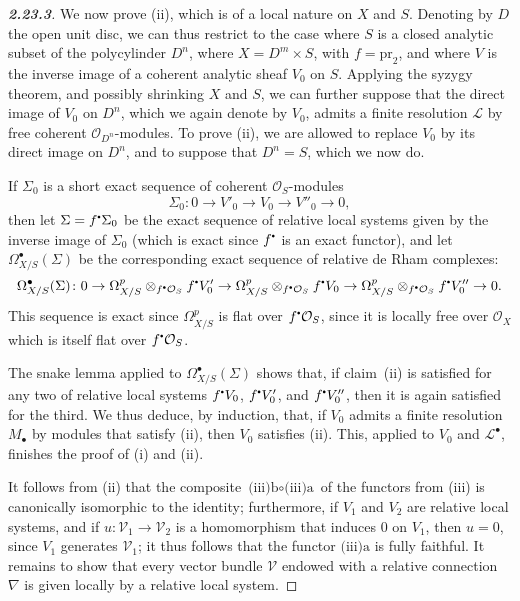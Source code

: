 \documentclass{report}
\newcommand{\scr}[1]{{\mathscr{#1}}}
\renewcommand{\cal}[1]{{\mathcal{#1}}}
\newcommand{\sbullet}{{\mathbin{\vcenter{\hbox{\scalebox{.5}{$\bullet$}}}}}}
\newcommand{\pr}{\mathrm{pr}}
\newcommand{\oldpage}[1]{\marginpar{\footnotesize$\Big\vert$ \textit{p.~#1}}}
\begin{document}
\begin{proof}[\normalfont\textbf{2.23.3}]
\label{I.2.23.3}
  We now prove (ii), which is of a local nature on $X$ and $S$.
  Denoting by $D$ the open unit disc, we can thus restrict to the case where $S$ is a closed analytic subset of the polycylinder $D^n$, where $X=D^m\times S$, with $f=\pr_2$, and where $V$ is the inverse image of a coherent analytic sheaf $V_0$ on $S$.
  Applying the syzygy theorem, and possibly shrinking $X$ and $S$, we can further suppose that the direct image of $V_0$ on $D^n$, which we again denote by $V_0$, admits a finite resolution $\scr{L}$ by free coherent $\cal{O}_{D^n}$-modules.
  To prove (ii), we are allowed to replace $V_0$ by its direct image on $D^n$, and to suppose that $D^n=S$, which we now do.

  If $\Sigma_0$ is a short exact sequence of coherent $\cal{O}_S$-modules
  \[
    \Sigma_0\colon 0 \to V'_0 \to V_0 \to V''_0 \to 0,
  \]
  then let $\Sigma=f^\sbullet\Sigma_0$ be the exact sequence of relative local systems given by the inverse image of $\Sigma_0$ (which is exact since $f^\sbullet$ is an exact functor), and let $\Omega_{X/S}^\bullet(\Sigma)$ be the corresponding exact sequence of relative de Rham complexes:
  \[
    \Omega_{X/S}^\bullet(\Sigma)\colon 0 \to \Omega_{X/S}^p\otimes_{f^\sbullet\cal{O}_S}f^\sbullet V'_0 \to \Omega_{X/S}^p\otimes_{f^\sbullet\cal{O}_S}f^\sbullet V_0 \to \Omega_{X/S}^p\otimes_{f^\sbullet\cal{O}_S}f^\sbullet V''_0 \to 0.
  \]
  This sequence is exact since $\Omega_{X/S}^p$ is flat over $f^\sbullet\cal{O}_S$, since it is locally free over $\cal{O}_X$ which is itself flat over $f^\sbullet\cal{O}_S$.

  The snake lemma applied to $\Omega_{X/S}^\bullet(\Sigma)$ shows that, if claim~(ii)
\oldpage{17}
  is satisfied for any two of relative local systems $f^\sbullet V_0$, $f^\sbullet V'_0$, and $f^\sbullet V''_0$, then it is again satisfied for the third.
  We thus deduce, by induction, that, if $V_0$ admits a finite resolution $M_\bullet$ by modules that satisfy (ii), then $V_0$ satisfies (ii).
  This, applied to $V_0$ and $\scr{L}^\bullet$, finishes the proof of (i) and (ii).

  It follows from (ii) that the composite $\mbox{(iii)b}\circ\mbox{(iii)a}$ of the functors from (iii) is canonically isomorphic to the identity;
  furthermore, if $V_1$ and $V_2$ are relative local systems, and if $u\colon\cal{V}_1\to\cal{V}_2$ is a homomorphism that induces $0$ on $V_1$, then $u=0$, since $V_1$ generates $\cal{V}_1$;
  it thus follows that the functor $\mbox{(iii)a}$ is fully faithful.
  It remains to show that every vector bundle $\cal{V}$ endowed with a relative connection $\nabla$ is given locally by a relative local system.


\end{proof}
\end{document}
